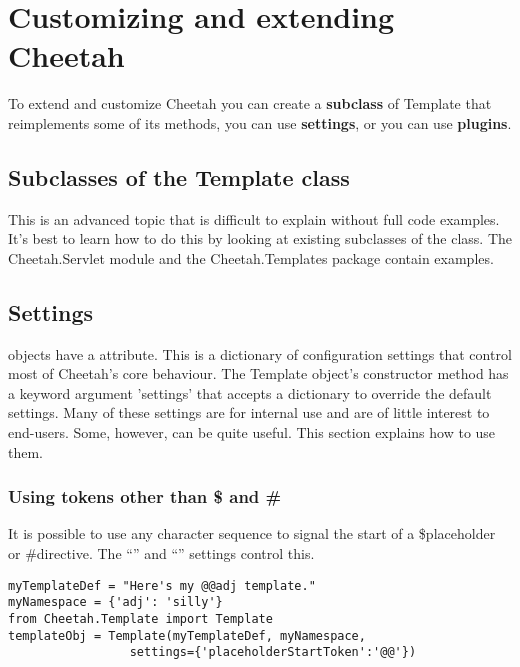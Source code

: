 \section{Customizing and extending Cheetah}
\label{customizing}

To extend and customize Cheetah you can create a {\bf subclass} of Template that
reimplements some of its methods, you can use {\bf settings}, or you can use
{\bf plugins}.

\subsection{Subclasses of the Template class}

This is an advanced topic that is difficult to explain without full code
examples.  It's best to learn how to do this by looking at existing subclasses
of the  class.  The Cheetah.Servlet module and the
Cheetah.Templates package contain examples.


\subsection{Settings}

 objects have a  attribute. This is a dictionary of
configuration settings that control most of Cheetah's core behaviour.  The
Template object's constructor method has a keyword argument 'settings' that
accepts a dictionary to override the default settings.  Many of these settings
are for internal use and are of little interest to end-users.  Some, however,
can be quite useful.  This section explains how to use them.

\subsubsection{Using tokens other than \$ and \#}

It is possible to use any character sequence to signal the start of a
\$placeholder or \#directive.  The ``'' and
``'' settings control this.

\begin{verbatim}
myTemplateDef = "Here's my @@adj template."
myNamespace = {'adj': 'silly'}
from Cheetah.Template import Template
templateObj = Template(myTemplateDef, myNamespace, 
                 settings={'placeholderStartToken':'@@'})
\end{verbatim}

